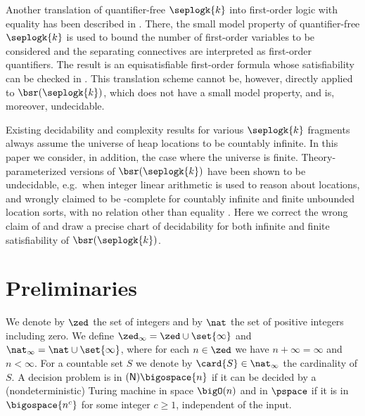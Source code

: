 Another translation of quantifier-free $\seplogk{k}$ into first-order
logic with equality has been described in
\cite{CalcagnoGardnerHague05}. There, the small model property of
quantifier-free $\seplogk{k}$ \cite{CalcagnoYangOHearn01} is used to
bound the number of first-order variables to be considered and the
separating connectives are interpreted as first-order quantifiers. The
result is an equisatisfiable first-order formula whose satisfiability
can be checked in \pspace. This translation scheme cannot be, however,
directly applied to $\bsr(\seplogk{k})$, which does not have a small
model property, and is, moreover, undecidable.

Existing decidability and complexity results for various $\seplogk{k}$
fragments
\cite{CalcagnoYangOHearn01,BrocheninDemriLozes11,DemriGalmicheWendlingMery14,DemriDeters14}
always assume the universe of heap locations to be countably
infinite. In this paper we consider, in addition, the case where the
universe is finite. Theory-parameterized versions of
$\bsr(\seplogk{k})$ have been shown to be undecidable, e.g.\ when
integer linear arithmetic is used to reason about locations, and
wrongly claimed to be \pspace-complete for countably infinite and
finite unbounded location sorts, with no relation other than equality
\cite{Vmcai17}. Here we correct the wrong claim of \cite{Vmcai17} and
draw a precise chart of decidability for both infinite and finite
satisfiability of $\bsr(\seplogk{k})$.

\section{Preliminaries}

We denote by $\zed$ the set of integers and by $\nat$ the set of
positive integers including zero. We define $\zed_{\infty} = \zed \cup
\set{\infty}$ and $\nat_{\infty} = \nat \cup \set{\infty}$, where for
each $n \in \zed$ we have $n + \infty = \infty$ and $n<\infty$. For a
countable set $S$ we denote by $\card{S} \in \nat_\infty$ the
cardinality of $S$. A decision problem is in
$\mathsf{(N)}\bigospace{n}$ if it can be decided by a
(nondeterministic) Turing machine in space $\bigO(n)$ and in $\pspace$
if it is in $\bigospace{n^c}$ for some integer $c \geq 1$, independent
of the input.

